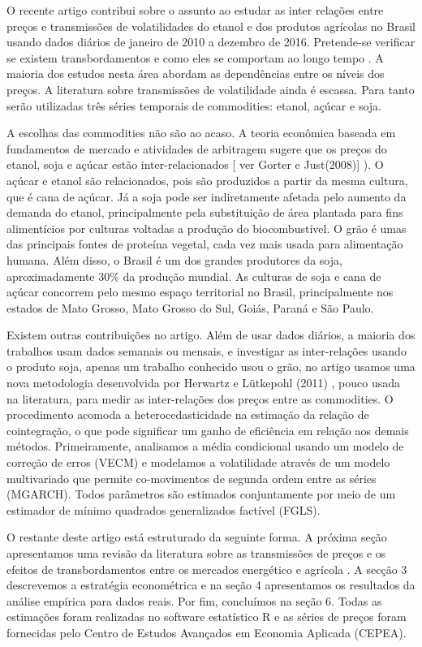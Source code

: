\documentclass[a4paper,12pt] {article}
\begin{document}
O recente artigo contribui sobre o assunto ao estudar as inter relações  entre preços e transmissões de volatilidades do etanol e dos produtos agrícolas no Brasil usando dados diários de janeiro de 2010 a dezembro de 2016. Pretende-se verificar se existem transbordamentos e como eles se comportam ao longo tempo . A maioria dos estudos nesta área abordam as dependências entre os níveis dos preços. A literatura sobre transmissões de volatilidade ainda é escassa. Para tanto serão utilizadas três séries temporais de commodities: etanol, açúcar e soja. 

A escolhas das commodities não são ao acaso. A teoria econômica baseada em fundamentos de mercado e atividades de arbitragem sugere que os preços do etanol, soja e açúcar estão inter-relacionados [ ver Gorter e Just(2008)] ). O açúcar e etanol são relacionados, pois são produzidos a partir da mesma cultura, que é cana de açúcar. Já a soja pode ser indiretamente  afetada pelo aumento da demanda do etanol, principalmente pela substituição de área plantada para fins alimentícios por culturas voltadas a produção do biocombustível.  O grão é umas das principais fontes de proteína vegetal, cada vez mais usada para alimentação humana.  Além disso, o Brasil é um dos grandes produtores da soja, aproximadamente 30\% da produção mundial. As culturas de soja e cana de açúcar  concorrem pelo mesmo espaço territorial no Brasil, principalmente nos estados de Mato Grosso, Mato Grosso do Sul, Goiás, Paraná e São Paulo. 

Existem outras contribuições no artigo. Além de usar dados diários, a maioria dos trabalhos usam dados semanais ou mensais, e investigar as inter-relações usando o produto soja, apenas um trabalho conhecido usou o grão, no artigo usamos uma nova metodologia desenvolvida  por Herwartz e Lütkepohl (2011) , pouco usada na literatura, para medir as inter-relações dos preços entre as commodities. O procedimento  acomoda a heterocedasticidade na estimação da relação de cointegração, o que pode significar um ganho de eficiência em relação aos demais métodos. Primeiramente,  analisamos a média condicional usando um modelo de correção de erros (VECM) e modelamos a  volatilidade através de um modelo multivariado que permite co-movimentos de segunda ordem entre as séries (MGARCH).  Todos parâmetros  são estimados conjuntamente por meio de um estimador de mínimo quadrados generalizados factível (FGLS).

O restante deste artigo está estruturado da seguinte forma. A próxima seção apresentamos uma revisão da literatura sobre as transmissões de preços e os efeitos de transbordamentos entre os mercados energético e agrícola . A secção 3 descrevemos  a estratégia econométrica e na seção 4 apresentamos os resultados da análise empírica para dados reais. Por fim, concluímos na seção 6. Todas as estimações foram realizadas no software estatístico R e as séries de preços foram fornecidas pelo Centro de Estudos Avançados em Economia Aplicada (CEPEA).

 
\end{document}

